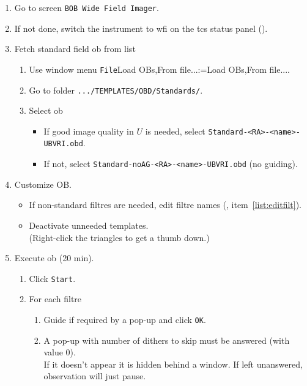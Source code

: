 \documentclass[11pt,fleqn,a4paper]{book}
\makeatletter
\def\menu#1#2{\texttt{#1}\ifx{}#2\else\@for\@x:=#2\do{$\rightarrow$\texttt{\@x}}\fi}
\def\wmenu#1#2{window menu \menu{#1}{#2}}
\def\fetchob{\wmenu{File}{Load OBs,From file...}}
\makeatother
\begin{document}
\begin{enumerate}
  \item Go to screen \texttt{BOB Wide Field Imager}.
  \item If not done, switch the instrument to \gls{wfi} on the \gls{tcs} status panel
        ().
  \item Fetch \gls{standard field} \gls{ob} from list 
    \begin{enumerate}
       \item Use \fetchob.
       \item Go to folder \texttt{.../TEMPLATES/OBD/Standards/}.
       \item Select \gls{ob}
          \begin{itemize}
            \item If good image quality in $U$ is needed, select \texttt{Standard-<RA>-<name>-UBVRI.obd}.
            \item If not, select  \texttt{Standard-noAG-<RA>-<name>-UBVRI.obd} (no guiding).
          \end{itemize}
    \end{enumerate}
   \item Customize OB.
     \begin{itemize}
       \item If non-standard filtres are needed, edit filtre names (, item~\ref{list:editfilt}).
       \item Deactivate unneeded \gls{template}s.\\
               (Right-click the triangles to get a thumb down.)
     \end{itemize}
   \item Execute \gls{ob} (20 min).
     \begin{enumerate}
        \item Click \texttt{Start}.
        \item For each filtre
         \begin{enumerate}
             \item Guide if required by a pop-up and click \texttt{OK}.
             \item A pop-up with number of dithers to skip must be answered (with value 0).\\
               If it doesn't appear it is hidden behind a window.  If left unanswered, observation will just pause. 
         \end{enumerate}
      \end{enumerate}
\end{enumerate}
   
\end{document}
